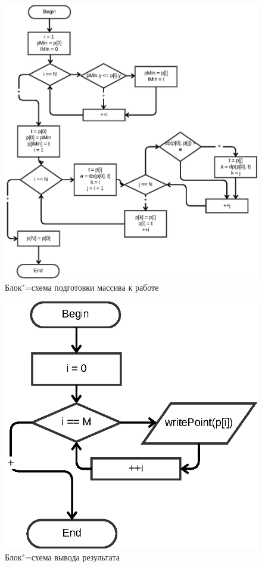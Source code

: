\documentclass[a4paper,12pt,notitlepage,headsepline,pdftex]{scrartcl}
\begin{document}
\begin{figure}[h]
  \begin{center}
    \includegraphics{sort.eps}
  \end{center}
  \caption{Блок"=схема подготовки массива к работе}
  \label{fig:sort}
\end{figure}

\begin{figure}[h]
  \begin{center}
    \includegraphics{output.eps}
  \end{center}
  \caption{Блок"=схема вывода результата}
  \label{fig:output}
\end{figure}
\end{document}
